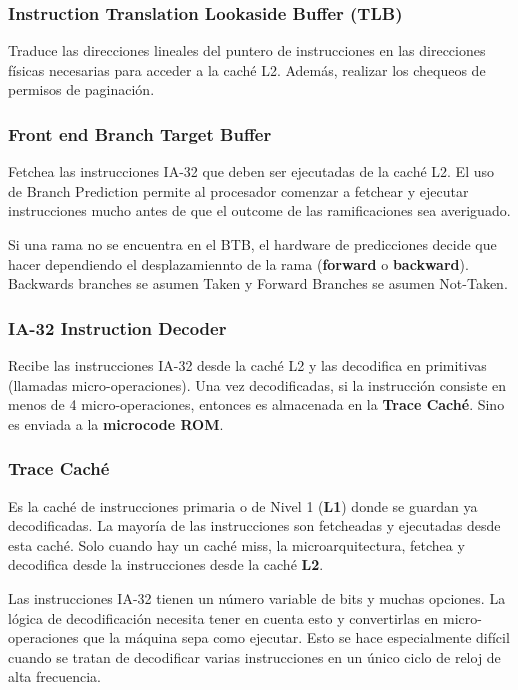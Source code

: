 \subsubsection*{Instruction Translation Lookaside Buffer (TLB)}
Traduce las direcciones lineales del puntero de instrucciones en las direcciones físicas necesarias para acceder a la caché L2. Además, realizar los chequeos de permisos de paginación.

\subsubsection*{Front end Branch Target Buffer}
Fetchea las instrucciones IA-32 que deben ser ejecutadas de la caché L2. El uso de Branch Prediction permite al procesador comenzar a fetchear y ejecutar instrucciones mucho antes de que el outcome de las ramificaciones sea averiguado.
	
Si una rama no se encuentra en el BTB, el hardware de predicciones decide que hacer dependiendo el desplazamiennto de la rama (\textbf{forward} o \textbf{backward}). Backwards branches se asumen Taken y Forward Branches se asumen Not-Taken.
	
\subsubsection*{IA-32 Instruction Decoder}
Recibe las instrucciones IA-32 desde la caché L2 y las decodifica en primitivas (llamadas micro-operaciones). Una vez decodificadas, si la instrucción consiste en menos de 4 micro-operaciones, entonces es almacenada en la \textbf{Trace Caché}. Sino es enviada a la \textbf{microcode ROM}.

\subsubsection*{Trace Caché} 
Es la caché de instrucciones primaria o de Nivel 1 (\textbf{L1}) donde se guardan ya decodificadas. La mayoría de las instrucciones son fetcheadas y ejecutadas desde esta caché. Solo cuando hay un caché miss, la microarquitectura, fetchea y decodifica desde la instrucciones desde la caché \textbf{L2}.
	
Las instrucciones IA-32 tienen un número variable de bits y muchas opciones. La lógica de decodificación necesita tener en cuenta esto y convertirlas en micro-operaciones que la máquina sepa como ejecutar. Esto se hace especialmente difícil cuando se tratan de decodificar varias instrucciones en un único ciclo de reloj de alta frecuencia.
	

